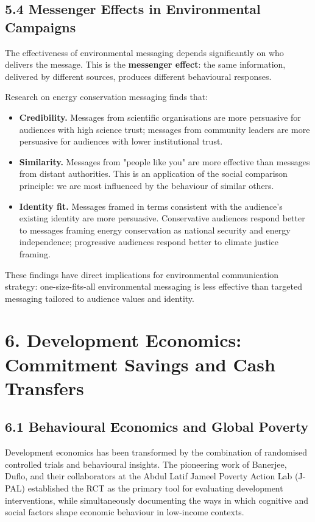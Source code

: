 \documentclass[12pt, letterpaper]{article}
\begin{document}
\subsection{5.4 Messenger Effects in Environmental Campaigns}


The effectiveness of environmental messaging depends significantly on who delivers the message. This is the \textbf{messenger effect}: the same information, delivered by different sources, produces different behavioural responses.

Research on energy conservation messaging finds that:
\begin{itemize}
\item \textbf{Credibility.} Messages from scientific organisations are more persuasive for audiences with high science trust; messages from community leaders are more persuasive for audiences with lower institutional trust.
\item \textbf{Similarity.} Messages from "people like you" are more effective than messages from distant authorities. This is an application of the social comparison principle: we are most influenced by the behaviour of similar others.
\item \textbf{Identity fit.} Messages framed in terms consistent with the audience's existing identity are more persuasive. Conservative audiences respond better to messages framing energy conservation as national security and energy independence; progressive audiences respond better to climate justice framing.
\end{itemize}

These findings have direct implications for environmental communication strategy: one-size-fits-all environmental messaging is less effective than targeted messaging tailored to audience values and identity.

\medskip


\section{6. Development Economics: Commitment Savings and Cash Transfers}



\subsection{6.1 Behavioural Economics and Global Poverty}


Development economics has been transformed by the combination of randomised controlled trials and behavioural insights. The pioneering work of Banerjee, Duflo, and their collaborators at the Abdul Latif Jameel Poverty Action Lab (J-PAL) established the RCT as the primary tool for evaluating development interventions, while simultaneously documenting the ways in which cognitive and social factors shape economic behaviour in low-income contexts.
\end{document}
